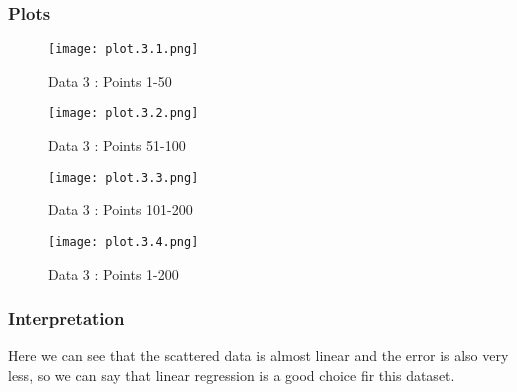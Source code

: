 \documentclass[12pt]{article}
\begin{document}
        \subsubsection{Plots}
            \begin{figure}[H]
                \centering
                \texttt{[image: plot.3.1.png]}
                \caption{Data 3 : Points 1-50}
                \label{fig:2.1}
            \end{figure}
            \begin{figure}[H]
                \centering
                \texttt{[image: plot.3.2.png]}
                \caption{Data 3 : Points 51-100}
                \label{fig:2.2}
            \end{figure}
            \begin{figure}[H]
                \centering
                \texttt{[image: plot.3.3.png]}
                \caption{Data 3 : Points 101-200}
                \label{fig:2.3}
            \end{figure}
            \begin{figure}[H]
                \centering
                \texttt{[image: plot.3.4.png]}
                \caption{Data 3 : Points 1-200}
                \label{fig:2.4}
            \end{figure}
            
        \subsubsection{Interpretation}
                Here we  can see that the scattered data is almost linear and the error is also very less, so we can say that linear regression is a good choice fir this dataset.                
    \newpage
\end{document}
